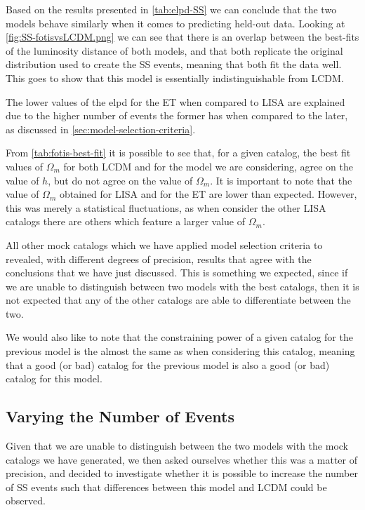 Based on the results presented in \cref{tab:elpd-SS} we can conclude that the two models behave similarly when it comes to predicting held-out data. Looking at \cref{fig:SS-fotisvsLCDM.png} we can see that there is an overlap between the best-fits of the luminosity distance of both models, and that both replicate the original distribution used to create the \gls{SS} events, meaning that both fit the data well. This goes to show that this model is essentially indistinguishable from \gls{LCDM}.

The lower values of the \gls{elpd} for the \gls{ET} when compared to \gls{LISA} are explained due to the higher number of events the former has when compared to the later, as discussed in \cref{sec:model-selection-criteria}.

From \cref{tab:fotis-best-fit} it is possible to see that, for a given catalog, the best fit values of $\Omega_m$ for both \gls{LCDM} and for the model we are considering, agree on the value of $h$, but do not agree on the value of $\Omega_m$. It is important to note that the value of $\Omega_m$ obtained for \gls{LISA} and for the \gls{ET} are lower than expected. However, this was merely a statistical fluctuations, as when consider the other \gls{LISA} catalogs there are others which feature a larger value of $\Omega_m$.

All other mock catalogs which we have applied model selection criteria to revealed, with different degrees of precision, results that agree with the conclusions that we have just discussed. This is something we expected, since if we are unable to distinguish between two models with the best catalogs, then it is not expected that any of the other catalogs are able to differentiate between the two.

We would also like to note that the constraining power of a given catalog for the previous model is the almost the same as when considering this catalog, meaning that a good (or bad) catalog for the previous model is also a good (or bad) catalog for this model.


\subsection{Varying the Number of Events}
\label{subsec:variable-number}

Given that we are unable to distinguish between the two models with the mock catalogs we have generated, we then asked ourselves whether this was a matter of precision, and decided to investigate whether it is possible to increase the number of \gls{SS} events such that differences between this model and \gls{LCDM} could be observed.

